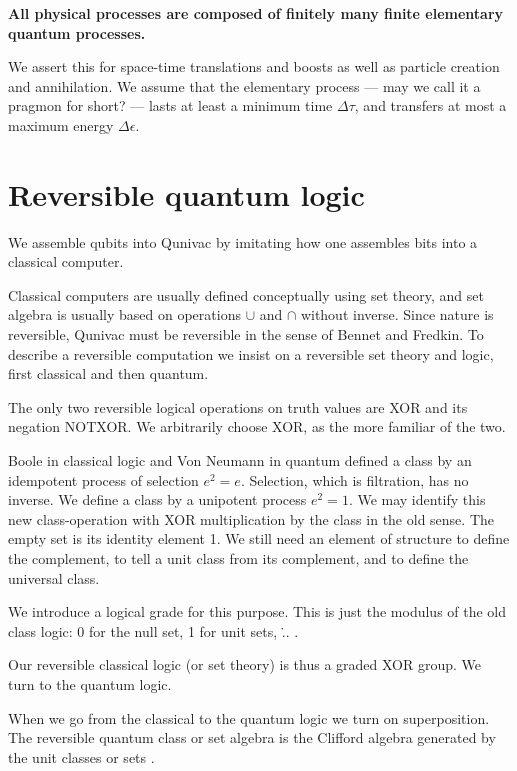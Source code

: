\documentclass[a4paper,11pt]{article}
\begin{document}
{\large \bf 
All physical processes
are composed of finitely many finite
elementary quantum processes.
\cite{FINKELSTEIN1969,WHEELER,FINKELSTEIN1996}}

We assert this for space-time translations and boosts
as well 
as particle creation and annihilation.
We assume that the elementary process
--- may we call it a pragmon for short? ---
lasts at least a minimum time $\Delta \tau$,
and 
transfers at most a maximum energy $\Delta \epsilon$.

\section{Reversible quantum logic}

We assemble qubits into  Qunivac
by imitating how one assembles bits into a classical
computer.

Classical computers are usually defined conceptually 
using set theory,
and set algebra is usually based on operations
$\cup$ and $\cap$
without inverse.
Since nature is reversible, Qunivac must be
reversible in the sense of Bennet and Fredkin.
To describe a reversible computation
we insist on a reversible set theory and  logic,
first classical and then quantum.

The only two reversible logical operations
on truth values 
are XOR  
and its negation NOTXOR.
We
arbitrarily choose XOR, as the more familiar of the two.

Boole in classical logic and Von Neumann in quantum
defined a class by an idempotent  process of selection $e^2=e$.
Selection, which is filtration,
 has no inverse. 
We define a class by a unipotent process $e^2=1$.
We may identify this new class-operation
with XOR multiplication by the class in the old sense.
The empty set is its identity element 1.
We still need an element of structure
to define the complement,
to tell a unit class from its complement,
and
to define the universal class.

We introduce a logical grade for this purpose.
This is just the modulus of the old class logic:
0 for the null set, 1 for unit sets, \... .

Our reversible classical logic (or set theory)
 is thus a graded XOR group.
We turn to the quantum logic.

When we go from the classical to the quantum logic
we turn on superposition.
The reversible quantum class or set algebra
is the Clifford algebra
generated by the unit classes or sets  \cite{FINKELSTEIN1982}.
\end{document}
